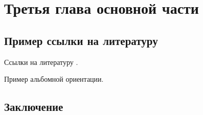 \chapter{Третья глава основной части}\label{chap:3}

\section{Пример ссылки на литературу}

Ссылки на литературу \cite{NLPub,Ustalov:14}.

\begin{landscape}

Пример альбомной ориентации.

\end{landscape}

\section{Заключение}
